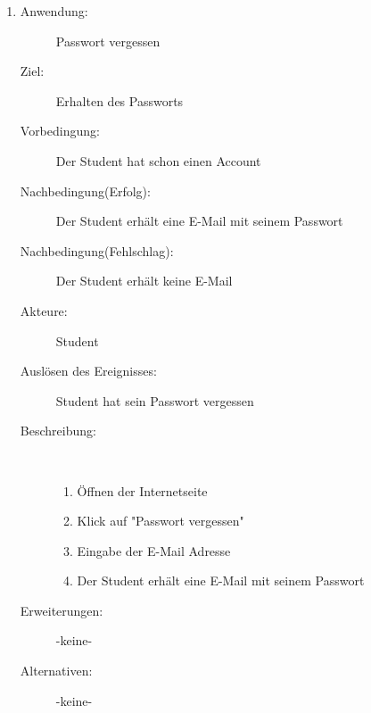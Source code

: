 \documentclass[parskip=full]{scrartcl}
\newcommand{\swtLabel}[1]{\textbf{\textbackslash #1\arabic*0\textbackslash}}
\begin{document}
\begin{enumerate}[label=\swtLabel{S}]
  
  \item
    \begin{description}
  	\item[Anwendung:] Passwort vergessen
  	\item[Ziel:] Erhalten des Passworts
  	\item[Vorbedingung:] Der Student hat schon einen Account
  	\item[Nachbedingung(Erfolg):] Der Student erhält eine E-Mail mit seinem
  	Passwort
  	\item[Nachbedingung(Fehlschlag):] Der Student erhält keine E-Mail
  	\item[Akteure:] Student
  	\item[Auslösen des Ereignisses:] Student hat sein Passwort vergessen
  	\item[Beschreibung:]~
  	\begin{enumerate}
  	  \item Öffnen der Internetseite
      \item Klick auf "Passwort vergessen"
      \item Eingabe der E-Mail Adresse
      \item Der Student erhält eine E-Mail mit seinem Passwort
  	\end{enumerate}
  	\item[Erweiterungen:] -keine-
  	\item[Alternativen:] -keine-
  \end{description}
   
\end{enumerate}
\end{document}
